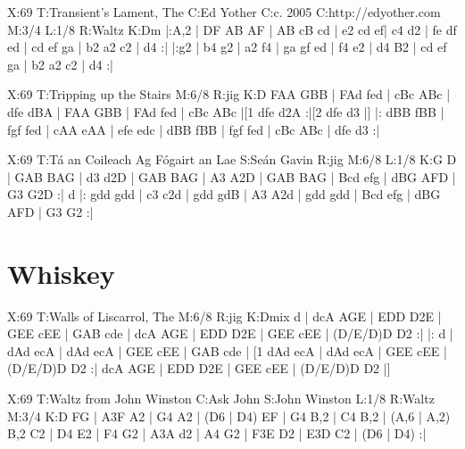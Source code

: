 \documentclass[letterpaper]{article}
\begin{document}
\begin{abc}[name]
X:69
T:Transient's Lament, The
C:Ed Yother
C:c. 2005
C:http://edyother.com
M:3/4
L:1/8
R:Waltz
K:Dm
|:A,2 | DF AB AF | AB cB cd | e2 cd ef| c4 d2 |
 fe df ed | cd ef ga | b2 a2 c2 | d4 :|
|:g2 | b4 g2 | a2 f4 | ga gf ed | f4 e2 |
 d4 B2 | cd ef ga | b2 a2 c2 | d4 :|
\end{abc}

\begin{abc}[name]
X:69
T:Tripping up the Stairs
M:6/8
R:jig
K:D
FAA GBB | FAd fed | cBc ABc | dfe dBA |
FAA GBB | FAd fed | cBc ABc |[1 dfe d2A :|[2 dfe d3 |]
|: dBB fBB | fgf fed | cAA eAA | efe edc |
dBB fBB | fgf fed | cBc ABc | dfe d3 :|
\end{abc}

\begin{abc}[name]
X:69
T:Tá an Coileach Ag Fógairt an Lae
S:Seán Gavin
R:jig
M:6/8
L:1/8
K:G
D | GAB BAG | d3 d2D | GAB BAG | A3 A2D |
GAB BAG | Bcd efg | dBG AFD | G3 G2D :|
d |: gdd gdd | c3 c2d | gdd gdB | A3 A2d |
gdd gdd | Bcd efg | dBG AFD | G3 G2 :|
\end{abc}

\section{Whiskey}
\begin{abc}[name]
X:69
T:Walls of Liscarrol, The
M:6/8
R:jig
K:Dmix
d | dcA AGE | EDD D2E | GEE cEE | GAB cde |
dcA AGE | EDD D2E | GEE cEE | (D/E/D)D D2 :|
|: d | dAd ecA | dAd ecA | GEE cEE | GAB cde |
[1 dAd ecA | dAd ecA | GEE cEE | (D/E/D)D D2 :|
dcA AGE | EDD D2E | GEE cEE | (D/E/D)D D2 |]
\end{abc}

\begin{abc}[name]
X:69
T:Waltz from John Winston
C:Ask John
S:John Winston
L:1/8
R:Waltz
M:3/4
K:D
FG | A3F A2 | G4 A2 | (D6 | D4) EF | G4 B,2 | C4 B,2 | (A,6 | A,2) B,2 C2 |
D4 E2 | F4 G2 | A3A d2 | A4 G2 | F3E D2 | E3D C2 | (D6 | D4) :|
\end{abc}
\end{document}
